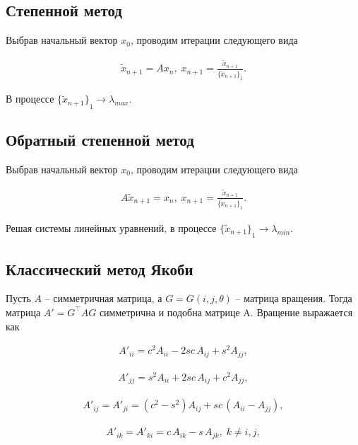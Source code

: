 \subsection{Степенной метод}

Выбрав начальный вектор $ x_0 $, проводим итерации следующего вида

\hs
\begin{gather}
     \tilde{x}_{n+1} = A x_n, \; x_{n+1} = \frac{\tilde{x}_{n+1}}{{\{\tilde{x}_{n+1}\}}_1}.
\end{gather}

В процессе $ {\{\tilde{x}_{n+1}\}}_1 \longrightarrow \lambda_{max} $.

\subsection{Обратный степенной метод}

Выбрав начальный вектор $ x_0 $, проводим итерации следующего вида

\hs
\begin{gather}
     A \tilde{x}_{n+1} = x_n, \; x_{n+1} = \frac{\tilde{x}_{n+1}}{{\{\tilde{x}_{n+1}\}}_1}.
\end{gather}

Решая системы линейных уравнений, в процессе $ {\{\tilde{x}_{n+1}\}}_1 \longrightarrow \lambda_{min} $.

\subsection{Классический метод Якоби}

Пусть $ A $ -- симметричная матрица, а $ G = G(i, j, \theta) $ -- матрица вращения. Тогда матрица $ A' = G^\top A G $ симметрична и подобна матрице A. Вращение выражается как

\hs
\begin{gather}
A'_{ii} = c^2 A_{ii} - 2 sc \, A_{ij} + s^2 A_{jj},
\end{gather}

\begin{gather}
A'_{jj} = s^2 A_{ii} + 2 sc \, A_{ij} + c^2 A_{jj},
\end{gather}

\begin{gather}
A'_{ij} = A'_{ji} = (c^2 - s^2) A_{ij} + sc \, (A_{ii} - A_{jj}),
\end{gather}

\begin{gather}
A'_{ik} = A'_{ki} = c \, A_{ik} - s \, A_{jk}, \; k \neq i, j,
\end{gather}

